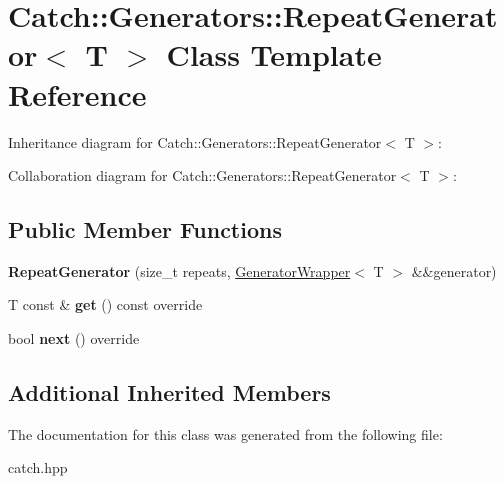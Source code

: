 \hypertarget{classCatch_1_1Generators_1_1RepeatGenerator}{}\section{Catch\+:\+:Generators\+:\+:Repeat\+Generator$<$ T $>$ Class Template Reference}
\label{classCatch_1_1Generators_1_1RepeatGenerator}


Inheritance diagram for Catch\+:\+:Generators\+:\+:Repeat\+Generator$<$ T $>$\+:


Collaboration diagram for Catch\+:\+:Generators\+:\+:Repeat\+Generator$<$ T $>$\+:
\subsection*{Public Member Functions}
\begin{DoxyCompactItemize}
\item 
\mbox{\label{classCatch_1_1Generators_1_1RepeatGenerator_a3aee12c4f9c2c04823ca3c75a20f234f}} 
{\bfseries Repeat\+Generator} (size\+\_\+t repeats, \hyperlink{classCatch_1_1Generators_1_1GeneratorWrapper}{Generator\+Wrapper}$<$ T $>$ \&\&generator)
\item 
\mbox{\label{classCatch_1_1Generators_1_1RepeatGenerator_a43bd573274c9a0cd7f4406a3d0d36d49}} 
T const  \& {\bfseries get} () const override
\item 
\mbox{\label{classCatch_1_1Generators_1_1RepeatGenerator_a24d5c2b1c09d6d220d4bd4c83f222dcb}} 
bool {\bfseries next} () override
\end{DoxyCompactItemize}
\subsection*{Additional Inherited Members}


The documentation for this class was generated from the following file\+:\begin{DoxyCompactItemize}
\item 
catch.\+hpp\end{DoxyCompactItemize}
